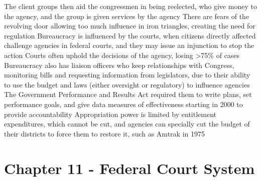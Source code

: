 \documentclass[11 pt, twoside]{article}
\newenvironment{outline*}
{
	\begin{outline}[enumerate]
	}
	{\end{outline}
}
\begin{document}
\begin{outline*}
\2 The client groups then aid the congressmen in being reelected, who give money to the agency, and the group is given services by the agency
\2 There are fears of the revolving door allowing too much influence in iron triangles, creating the need for regulation
\1 Bureaucracy is influenced by the courts, when citizens directly affected challenge agencies in federal courts, and they may issue an injunction to stop the action
\2 Courts often uphold the decisions of the agency, losing >75\% of cases
\1 Bureaucracy also has liaison officers who keep relationships with Congress, monitoring bills and requesting information from legislators, due to their ability to use the budget and laws (either oversight or regulatory) to influence agencies
\2 The Government Performance and Results Act required them to write plans, set performance goals, and give data measures of effectiveness starting in 2000 to provide accountability
\2 Appropriation power is limited by entitlement expenditures, which cannot be cut, and agencies can specially cut the budget of their districts to force them to restore it, such as Amtrak in 1975
\end{outline*}
\section{Chapter 11 - Federal Court System}
\end{document}
